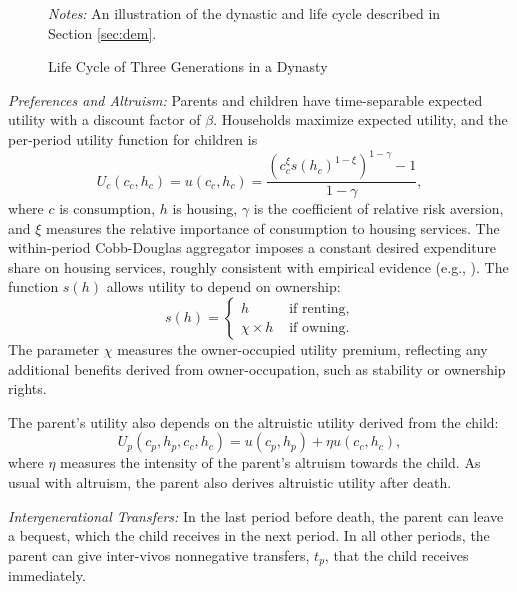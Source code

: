 \documentclass[12pt]{article}
\begin{document}
\begin{figure}\begin{center}
	\caption{Life Cycle of Three Generations in a Dynasty }\label{fig:overview}
	
	{\begin{footnotesize} \textit{Notes:} An illustration of the dynastic and life cycle described in Section \ref{sec:dem}.\end{footnotesize}}
\end{center}
\end{figure}

\textit{Preferences and Altruism:} Parents and children have time-separable expected utility with a discount factor of $\beta$. Households maximize expected utility, and the per-period utility function for children is
\begin{equation}
U_c(c_c,h_c) = u(c_c,h_c) = \frac{\left(c_c^\xi s(h_c)^{1-\xi}\right)^{1-\gamma}-1}{1-\gamma},
\end{equation}
where $c$ is consumption, $h$ is housing, $\gamma$ is the coefficient of relative risk aversion, and $\xi$ measures the relative importance of consumption to housing services. The within-period Cobb-Douglas aggregator imposes a constant desired expenditure share on housing services, roughly consistent with empirical evidence (e.g., \cite{davis2011household}). The function $s(h)$ allows utility to depend on ownership:
\begin{equation}
s(h) = \begin{cases}
h & \text{ if renting}, \\
\chi \times h & \text{ if owning}.
\end{cases}
\end{equation}
The parameter $\chi$ measures the owner-occupied utility premium, reflecting any additional benefits derived from owner-occupation, such as stability or ownership rights.

The parent's utility also depends on the altruistic utility derived from the child:
\begin{equation}
U_p(c_p,h_p,c_c,h_c) = u(c_p,h_p) + \eta u(c_c,h_c),
\end{equation}
where $\eta$ measures the intensity of the parent's altruism towards the child. As usual with altruism, the parent also derives altruistic utility after death.

\textit{Intergenerational Transfers:} In the last period before death, the parent can leave a bequest, which the child receives in the next period. In all other periods, the parent can give inter-vivos nonnegative transfers, $t_p$, that the child receives immediately.
\end{document}
